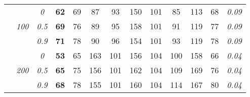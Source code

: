 \begin{table}
\begin{center}
\begin{tabular}{ccc|cc|cc|cc|cc|c|c}
\cline{2-3}\rule{0pt}{3ex}
& & \it  0  & {\bf 62} & 69 & 87 & 93 & 150 & 101 & 85 & 113 & 68 & \it  0.09 \\
 & \it  100  & \it  0.5  & {\bf 69} & 76 & 89 & 95 & 158 & 101 & 91 & 119 & 77 & \it  0.09 \\
& & \it  0.9  & {\bf 71} & 78 & 90 & 96 & 154 & 101 & 93 & 119 & 78 & \it  0.09 \\[1ex]
\cline{2-3}\rule{0pt}{3ex}
& & \it  0  & {\bf 53} & 65 & 163 & 101 & 156 & 104 & 100 & 158 & 66 & \it  0.04 \\
 & \it  200  & \it  0.5  & {\bf 65} & 75 & 156 & 101 & 162 & 104 & 109 & 169 & 76 & \it  0.04 \\
& & \it  0.9  & {\bf 68} & 78 & 155 & 101 & 160 & 104 & 114 & 167 & 80 & \it  0.04 \\
\hline\end{tabular}
\end{center}
\end{table}




